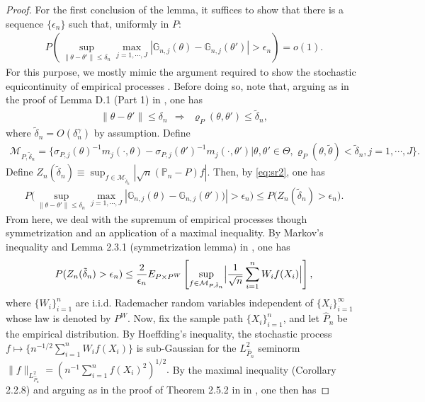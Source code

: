 \documentclass[letterpaper,11pt]{article}
\theoremstyle{myplain}
\theoremstyle{mydefinition}
\theoremstyle{myremark}
\renewcommand{\cite}{\citet}
\numberwithin{equation}{section}
\numberwithin{figure}{section}
\begin{document}
\begin{appendices}
\begin{proof}
For the first conclusion of the lemma, it suffices to show that there is a sequence $\{\epsilon_n\}$ such that, uniformly in $P$:
\begin{align}
P\left(\sup_{\|\theta-\theta'\|\le \delta_n}\max_{j=1,\cdots,J}|\mathbb G_{n,j}(\theta)-\mathbb G_{n,j}(\theta')|>\epsilon_n \right)=o(1).
\end{align}
For this purpose, we mostly mimic the argument required to show the stochastic equicontinuity of empirical processes \citep[see e.g.][Ch.2.5]{Vaart_Wellner2000aBK}. 
Before doing so, note that, arguing as in the proof of Lemma D.1 (Part 1) in \cite{BCS14_misp}, one has
\begin{align}
\|\theta-\theta'\|\le \delta_n~~\Rightarrow~~  \varrho_P(\theta,\theta')\le \tilde\delta_n,	\label{eq:sr2}
\end{align}
where $\tilde\delta_n=O(\delta_n^\gamma)$ by assumption.
Define
\begin{align}
\mathcal M_{P,\tilde \delta_n}=\{\sigma_{P,j}(\theta)^{-1}m_j(\cdot,\theta)-\sigma_{P,j}(\theta')^{-1}m_j(\cdot,\theta')| \theta,\theta'\in\Theta,\varrho_P(\theta,\tilde\theta)<\tilde\delta_n,j=1,\cdots,J\}.	\label{eq:sr3}
\end{align}
Define $Z_n(\tilde\delta_n)\equiv \sup_{f\in\mathcal M_{\tilde\delta_n}}|\sqrt n(\mathbb P_n-P)f|.$ Then, by \eqref{eq:sr2}, one has
\begin{align}
P\Biggl(\sup_{\|\theta-\theta'\|\le \delta_n}\max_{j=1,\cdots,J}|\mathbb G_{n,j}(\theta)-\mathbb G_{n,j}(\theta'))|>\epsilon_n)\le P(Z_n(\tilde\delta_n)>\epsilon_n \Biggr).\label{eq:sr4}	
\end{align}
From here, we deal with the supremum of  empirical processes though symmetrization and an application of a maximal inequality.
By Markov's inequality and Lemma 2.3.1 (symmetrization lemma) in \cite{Vaart_Wellner2000aBK}, one has
\begin{align}
P(Z_n(\tilde\delta_n)>\epsilon_n)\le \frac{2}{\epsilon_n}E_{P\times P^W}\left[\sup_{f\in\mathcal M_{P,\tilde\delta_n}}\Bigl\vert\frac{1}{\sqrt n}\sum_{i=1}^nW_i f(X_i)\Bigr\vert\right],\label{eq:sr5}
\end{align}
where $\{W_i\}_{i=1}^n$ are i.i.d. Rademacher random variables independent of $\{X_i\}_{i=1}^\infty$ whose law is denoted by $P^W$. Now, fix the sample path $\{X_i\}_{i=1}^n$, and let $\hat P_n$ be the empirical distribution. By Hoeffding's inequality, the stochastic process $f\mapsto\{n^{-1/2}\sum_{i=1}^nW_if(X_i)\}$ is sub-Gaussian for the $L^2_{\hat P_n}$ seminorm $\|f\|_{L^2_{\hat P_n}}=(n^{-1}\sum_{i=1}^n f(X_i)^2)^{1/2}.$ By the maximal inequality (Corollary 2.2.8) and arguing as in the proof of Theorem 2.5.2 in in \cite{Vaart_Wellner2000aBK}, one then has

\end{proof}
\end{appendices}
\end{document}

